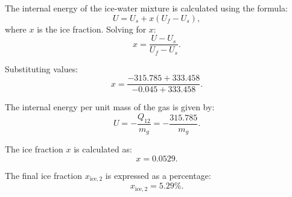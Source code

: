 The internal energy of the ice-water mixture is calculated using the formula:  
\[
U = U_s + x (U_f - U_s),
\]
where \( x \) is the ice fraction. Solving for \( x \):  
\[
x = \frac{U - U_s}{U_f - U_s}.
\]

Substituting values:  
\[
x = \frac{-315.785 + 333.458}{-0.045 + 333.458}.
\]

The internal energy per unit mass of the gas is given by:  
\[
U = -\frac{Q_{12}}{m_g} = -\frac{315.785}{m_g}.
\]

The ice fraction \( x \) is calculated as:  
\[
x = 0.0529.
\]

The final ice fraction \( x_{\text{ice},2} \) is expressed as a percentage:  
\[
x_{\text{ice},2} = 5.29\%.
\]